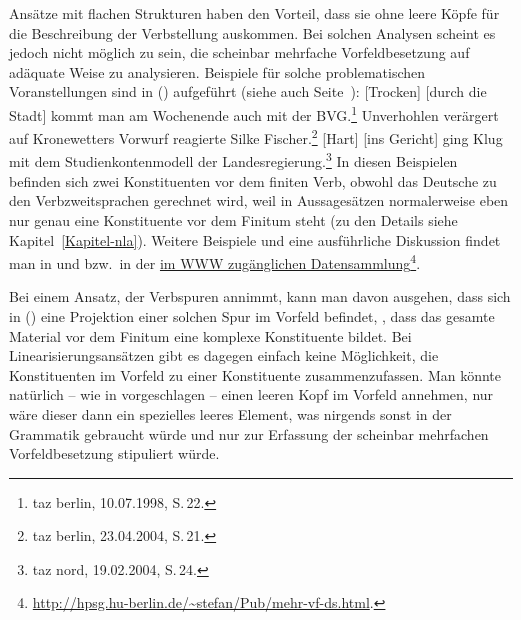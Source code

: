 Ansätze mit flachen Strukturen haben den Vorteil, dass sie ohne leere Köpfe für die Beschreibung der
Verbstellung auskommen. Bei solchen Analysen scheint es jedoch nicht möglich zu sein, die scheinbar
mehrfache Vorfeldbesetzung \citep{Mueller2005d,MuellerGS} auf adäquate Weise zu analysieren. Beispiele für
solche problematischen Voranstellungen sind in () aufgeführt (siehe auch Seite~\pageref{bsp-mehr-vf}):
\eal
\label{bsp-smvfb}
\ex {}[Trocken] [durch die Stadt] kommt man am Wochenende auch mit der BVG.\footnote{
        taz berlin, 10.07.1998, S.\,22.
      }
\ex {}Unverhohlen verärgert auf Kronewetters Vorwurf reagierte Silke Fischer.\footnote{
    taz berlin, 23.04.2004, S.\,21.
}
\ex {}[Hart] [ins Gericht] ging Klug mit dem Studienkontenmodell der Landesregierung.\footnote{
  taz nord, 19.02.2004, S.\,24.
  }
\zl
In diesen Beispielen befinden sich zwei Konstituenten vor dem finiten Verb, obwohl das Deutsche
zu den Verbzweitsprachen gerechnet wird, weil in Aussagesätzen
normalerweise eben nur genau eine Konstituente vor dem Finitum steht (zu den Details siehe Kapitel~\ref{Kapitel-nla}).
Weitere Beispiele und eine ausführliche Diskussion findet man in  und 
bzw.\ in der \href{http://hpsg.hu-berlin.de/~stefan/Pub/mehr-vf-ds.html}{im WWW zugänglichen Datensammlung}\footnote{
  \url{http://hpsg.hu-berlin.de/~stefan/Pub/mehr-vf-ds.html}. \mytoday%
}.

Bei einem Ansatz, der Verbspuren annimmt, kann man davon ausgehen, dass sich in () eine Projektion
einer solchen Spur im Vorfeld befindet, \dash, dass das gesamte Material vor dem Finitum eine komplexe Konstituente
bildet. Bei Linearisierungsansätzen gibt es dagegen einfach keine Möglichkeit, 
die Konstituenten im Vorfeld zu einer Konstituente zusammenzufassen. Man
könnte natürlich -- wie in  vorgeschlagen 
-- einen leeren Kopf im Vorfeld annehmen, nur wäre dieser dann ein spezielles leeres Element,
was nirgends sonst in der Grammatik gebraucht würde
und nur zur Erfassung der scheinbar mehrfachen Vorfeldbesetzung stipuliert würde.

